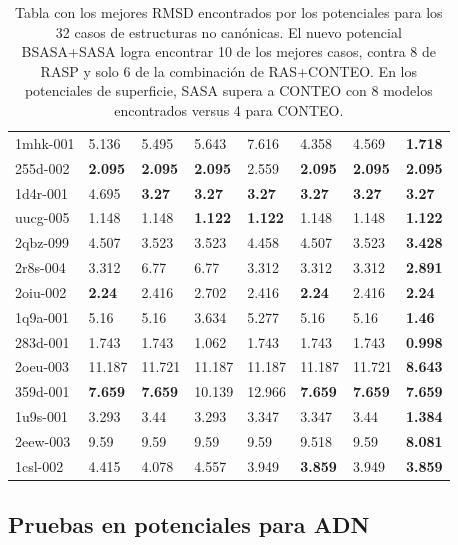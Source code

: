 \begin{table}[!htp]
\begin{tabular}{p{48pt}|p{40pt} p{40pt} p{40pt} p{43pt} p{47pt} p{49pt} p{43pt}}
1mhk-001 & 5.136 & 5.495 & 5.643 & 7.616 & 4.358 & 4.569 & \textbf{1.718} \\
255d-002 & \textbf{2.095} & \textbf{2.095} & \textbf{2.095} & 2.559 & \textbf{2.095} & \textbf{2.095} & \textbf{2.095} \\
1d4r-001 & 4.695 & \textbf{3.27} & \textbf{3.27} & \textbf{3.27} & \textbf{3.27} & \textbf{3.27} & \textbf{3.27} \\
uucg-005 & 1.148 & 1.148 & \textbf{1.122} & \textbf{1.122} & 1.148 & 1.148 & \textbf{1.122} \\
2qbz-099 & 4.507 & 3.523 & 3.523 & 4.458 & 4.507 & 3.523 & \textbf{3.428} \\
2r8s-004 & 3.312 & 6.77 & 6.77 & 3.312 & 3.312 & 3.312 & \textbf{2.891} \\
2oiu-002 & \textbf{2.24} & 2.416 & 2.702 & 2.416 & \textbf{2.24} & 2.416 & \textbf{2.24} \\
1q9a-001 & 5.16 & 5.16 & 3.634 & 5.277 & 5.16 & 5.16 & \textbf{1.46} \\
283d-001 & 1.743 & 1.743 & 1.062 & 1.743 & 1.743 & 1.743 & \textbf{0.998}\\
2oeu-003 & 11.187 & 11.721 & 11.187 & 11.187 & 11.187 & 11.721 & \textbf{8.643}\\
359d-001 & \textbf{7.659} & \textbf{7.659} & 10.139 & 12.966 & \textbf{7.659} & \textbf{7.659} & \textbf{7.659}\\
1u9s-001 & 3.293 & 3.44 & 3.293 & 3.347 & 3.347 & 3.44 & \textbf{1.384} \\
2eew-003 & 9.59 & 9.59 & 9.59 & 9.59 & 9.518 & 9.59 & \textbf{8.081} \\
1csl-002 & 4.415 & 4.078 & 4.557 & 3.949 & \textbf{3.859} & 3.949 & \textbf{3.859} \\
\hline
\end{tabular}
\caption[Tabla con los mejores RMSD encontrados para los 32 casos de estructuras no canónicas]{Tabla con los mejores RMSD encontrados por los potenciales para los 32 casos de estructuras no canónicas. El nuevo potencial BSASA+SASA logra encontrar 10 de los mejores casos, contra 8 de RASP y solo 6 de la combinación de RAS+CONTEO. En los potenciales de superficie, SASA supera a CONTEO con 8 modelos encontrados versus 4 para CONTEO.}
\label{table:farfar}
\end{table}

\cleardoublepage
\subsection{Pruebas en potenciales para ADN}
